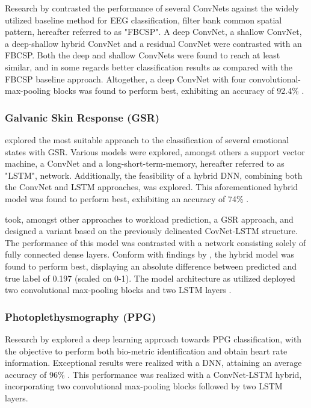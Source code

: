 \documentclass[12pt]{article}
\begin{document}
Research by  contrasted the performance of several ConvNets against the widely utilized baseline method for EEG classification, filter bank common spatial pattern, hereafter referred to as "FBCSP". A deep ConvNet, a shallow ConvNet, a deep-shallow hybrid ConvNet and a residual ConvNet were contrasted with an FBCSP. Both the deep and shallow ConvNets were found to reach at least similar, and in some regards better classification results as compared with the FBCSP baseline approach. Altogether, a deep ConvNet with four convolutional-max-pooling blocks was found to perform best, exhibiting an accuracy of 92.4\% \cite{schirrmeister2017deep}.

\subsubsection{Galvanic Skin Response (GSR)}
 explored the most suitable approach to the classification of several emotional states with GSR. Various models were explored, amongst others a support vector machine, a ConvNet and a long-short-term-memory, hereafter referred to as "LSTM", network. Additionally, the feasibility of a hybrid DNN, combining both the ConvNet and LSTM approaches, was explored. This aforementioned hybrid model was found to perform best, exhibiting an accuracy of 74\% \cite{sun2019hybrid}. 

 took, amongst other approaches to workload prediction,  a GSR approach, and designed a variant based on the previously delineated CovNet-LSTM structure. The performance of this model was contrasted with a network consisting solely of fully connected dense layers. Conform with findings by  , the hybrid model was found to perform best, displaying an absolute difference between predicted and true label of 0.197 (scaled on 0-1). The model architecture as utilized deployed two convolutional max-pooling blocks and two LSTM layers \cite{dolmans2020perceived}.

\subsubsection{Photoplethysmography (PPG)}
Research by  explored a deep learning approach towards PPG classification, with the objective to perform both bio-metric identification and obtain heart rate information. Exceptional results were realized with a DNN, attaining an average accuracy of 96\% \cite{biswas2019cornet}. This performance was realized with a ConvNet-LSTM hybrid, incorporating two convolutional max-pooling blocks followed by two LSTM layers. 
\end{document}
